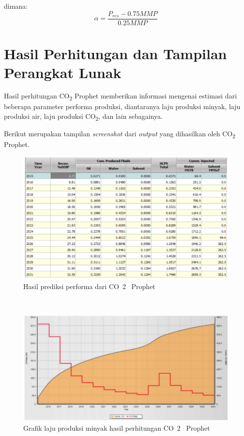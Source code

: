 \documentclass[
]{book}
\begin{document}
dimana:
\[\alpha = \frac{P_{res}-0.75MMP}{0.25MMP}\]

\hypertarget{hasil-perhitungan-dan-tampilan-perangkat-lunak}{%
\section{Hasil Perhitungan dan Tampilan Perangkat Lunak}\label{hasil-perhitungan-dan-tampilan-perangkat-lunak}}

Hasil perhitungan CO\textsubscript{2} Prophet memberikan informasi mengenai estimasi dari beberapa parameter performa produksi, diantaranya laju produksi minyak, laju produksi air, laju produksi CO\textsubscript{2}, dan lain sebagainya.

Berikut merupakan tampilan \emph{screenshot} dari \emph{output} yang dihasilkan oleh CO\textsubscript{2} Prophet.

\begin{figure}

{\centering \includegraphics[width=0.5\linewidth]{images/co2prophet/prediksiprophet} 

}

\caption{Hasil prediksi performa dari CO~2~ Prophet}\label{fig:unnamed-chunk-42}
\end{figure}

~

\begin{figure}

{\centering \includegraphics[width=0.5\linewidth]{images/co2prophet/produksiminyakprophet} 

}

\caption{Grafik laju produksi minyak hasil perhitungan CO~2~ Prophet}\label{fig:unnamed-chunk-43}
\end{figure}
\end{document}
